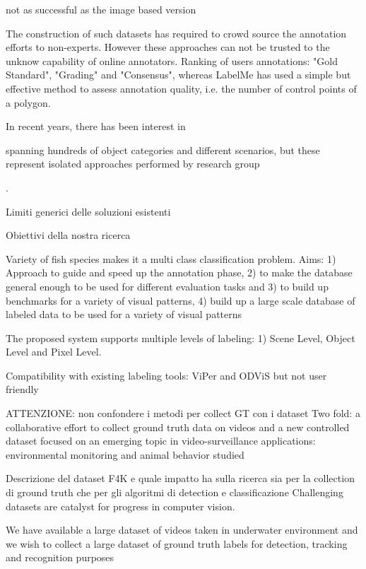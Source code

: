 not as successful as the image based version

The construction of such datasets has required to crowd source the annotation efforts to non-experts. However these approaches can not be trusted to the unknow capability of online annotators. Ranking of users annotations: "Gold Standard", "Grading" and "Consensus", whereas LabelMe has used a simple but effective method to assess annotation quality, i.e. the number of control points of a polygon.





In recent years, there has been interest in 

spanning hundreds of object categories and different scenarios, but these represent isolated approaches performed by research group 

. 

\item Limiti generici delle soluzioni esistenti
\item Obiettivi della nostra ricerca

Variety of fish species makes it a multi class classification problem.
Aims:
1) Approach to guide and speed up the annotation phase, 2) to make the database general enough to be used for different evaluation tasks and 3) to build up benchmarks for a variety of visual patterns, 4) build up a large scale database of labeled data to be used for a variety of visual patterns

The proposed system supports multiple levels of labeling: 1) Scene Level, Object Level and Pixel Level.

Compatibility with existing labeling tools: ViPer and ODViS but not user friendly 

ATTENZIONE: non confondere i metodi per collect GT con i dataset
Two fold: a collaborative effort to collect ground truth data on videos and a new controlled dataset focused on an emerging topic in video-surveillance applications: environmental monitoring and animal behavior studied

\item Descrizione del dataset F4K e quale impatto ha sulla ricerca sia per la collection di ground truth che per gli algoritmi di detection e classificazione
Challenging datasets are catalyst for progress in computer vision.

We have available a large dataset of videos taken in underwater environment and we wish to collect a large dataset of ground truth labels for detection, tracking and recognition purposes


